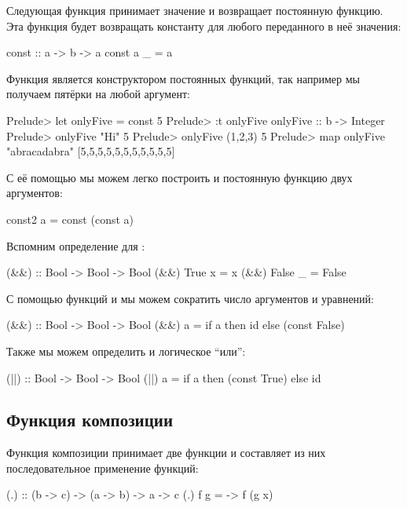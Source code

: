 Следующая функция  принимает значение и возвращает постоянную
функцию. Эта функция будет возвращать константу для любого переданного в
неё значения:


\begin{code}
const :: a -> b -> a
const a _ = a
\end{code}

Функция  является конструктором постоянных функций, так
например мы получаем пятёрки на любой аргумент:


\begin{code}
Prelude> let onlyFive = const 5
Prelude> :t onlyFive 
onlyFive :: b -> Integer
Prelude> onlyFive "Hi"
5
Prelude> onlyFive (1,2,3)
5
Prelude> map onlyFive "abracadabra"
[5,5,5,5,5,5,5,5,5,5,5]
\end{code}

С её помощью мы можем легко построить и постоянную функцию двух
аргументов:


\begin{code}
const2 a = const (const a)
\end{code}

Вспомним определение для \In{&&}:


\begin{code}
(&&) :: Bool -> Bool -> Bool
(&&) True   x  = x
(&&) False  _  = False  
\end{code}

С помощью функций  и  мы можем сократить число
аргументов и уравнений:


\begin{code}
(&&) :: Bool -> Bool -> Bool
(&&) a = if a then id else (const False)
\end{code}

Также мы можем определить и логическое ``или'':


\begin{code}
(||) :: Bool -> Bool -> Bool
(||) a = if a then (const True) else id
\end{code}

\subsection{Функция композиции}

Функция композиции принимает две функции и составляет из них
последовательное применение функций:


\begin{code}
(.) :: (b -> c) -> (a -> b) -> a -> c
(.) f g = \x -> f (g x)
\end{code}

